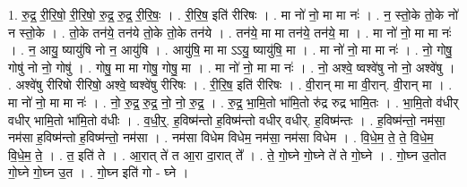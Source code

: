 \documentclass[17pt]{extarticle}
\begin{document}
1. रु॒द्र॒ री॒रि॒षो॒ री॒रि॒षो॒ रु॒द्र॒ रु॒द्र॒ री॒रि॒षः॒ । . री॒रि॒ष॒ इति॑ रीरिषः । . मा नो॑ नो॒ मा मा नः॑ । . न॒ स्तो॒के तो॒के नो॑ न स्तो॒के । . तो॒के तन॑ये॒ तन॑ये तो॒के तो॒के तन॑ये । . तन॑ये॒ मा मा तन॑ये॒ तन॑ये॒ मा । . मा नो॑ नो॒ मा मा नः॑ । . न॒ आयु॒ ष्यायु॑षि नो न॒ आयु॑षि । . आयु॑षि॒ मा मा ऽऽयु॒ ष्यायु॑षि॒ मा । . मा नो॑ नो॒ मा मा नः॑ । . नो॒ गोषु॒ गोषु॑ नो नो॒ गोषु॑ । . गोषु॒ मा मा गोषु॒ गोषु॒ मा । . मा नो॑ नो॒ मा मा नः॑ । . नो॒ अश्वे॒ ष्वश्वे॑षु नो नो॒ अश्वे॑षु । . अश्वे॑षु रीरिषो रीरिषो॒ अश्वे॒ ष्वश्वे॑षु रीरिषः । . री॒रि॒ष॒ इति॑ रीरिषः । . वी॒रान् मा मा वी॒रान्. वी॒रान् मा । . मा नो॑ नो॒ मा मा नः॑ । . नो॒ रु॒द्र॒ रु॒द्र॒ नो॒ नो॒ रु॒द्र॒ । . रु॒द्र॒ भा॒मि॒तो भा॑मि॒तो रु॑द्र रुद्र भामि॒तः । . भा॒मि॒तो व॑धीर् वधीर् भामि॒तो भा॑मि॒तो व॑धीः । . व॒धी॒र्॒. ह॒विष्म॑न्तो ह॒विष्म॑न्तो वधीर् वधीर्. ह॒विष्म॑न्तः । . ह॒विष्म॑न्तो॒ नम॑सा॒ नम॑सा ह॒विष्म॑न्तो ह॒विष्म॑न्तो॒ नम॑सा । . नम॑सा विधेम विधेम॒ नम॑सा॒ नम॑सा विधेम । . वि॒धे॒म॒ ते॒ ते॒ वि॒धे॒म॒ वि॒धे॒म॒ ते॒ । . त॒ इति॑ ते । . आ॒रात् ते॑ त आ॒रा दा॒रात् ते᳚ । . ते॒ गो॒घ्ने गो॒घ्ने ते॑ ते गो॒घ्ने । . गो॒घ्न उ॒तोत गो॒घ्ने गो॒घ्न उ॒त । . गो॒घ्न इति॑ गो - घ्ने । \newline
\end{document}
